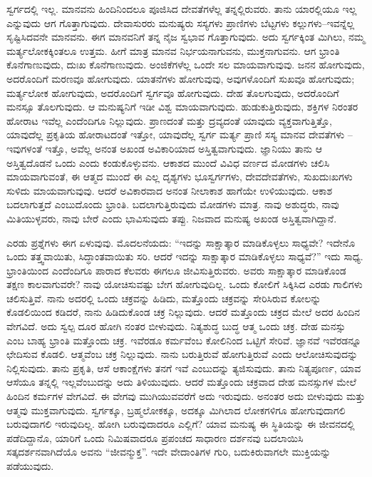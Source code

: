 ಸ್ವರ್ಗದಲ್ಲಿ ಇಲ್ಲ. ಮಾನವನು ಹಿಂದಿನಿಂದಲೂ ಪೂಜಿಸಿದ ದೇವತೆಗಳೆಲ್ಲ ತನ್ನಲ್ಲಿರುವರು. ತಾನು ಯಾರಲ್ಲಿಯೂ ಇಲ್ಲ ಎನ್ನುವುದು ಆಗ ಗೊತ್ತಾಗುವುದು. ದೇವಾಸುರರು ಮನುಷ್ಯರು ಸಸ್ಯಗಳು ಪ್ರಾಣಿಗಳು ಬೆಟ್ಟಗಳು ಕಲ್ಲುಗಳು–ಇವನ್ನೆಲ್ಲ ಸೃಷ್ಟಿಸಿದವನೇ ಮಾನವನು. ಈಗ ಮಾನವನಿಗೆ ತನ್ನ ನೈಜ ಸ್ವಭಾವ ಗೊತ್ತಾಗುವುದು. ಅದು ಸ್ವರ್ಗಕ್ಕಿಂತ ಮಿಗಿಲು, ನಮ್ಮ ಮರ್ತ್ಯಲೋಕಕ್ಕಿಂತಲೂ ಉತ್ತಮ. ಹೀಗೆ ಮಾತ್ರ ಮಾನವ ನಿರ್ಭಯನಾಗುವನು, ಮುಕ್ತನಾಗುವನು. ಆಗ ಭ್ರಾಂತಿ ಕೊನೆಗಾಣುವುದು, ದುಃಖ ಕೊನೆಗಾಣುವುದು. ಅಂಜಿಕೆಗಳೆಲ್ಲ ಒಂದೇ ಸಲ ಮಾಯವಾಗುವುವು. ಜನನ ಹೋಗುವುದು, ಅದರೊಂದಿಗೆ ಮರಣವೂ ಹೋಗುವುದು. ಯಾತನೆಗಳು ಹೋಗುವುವು, ಅವುಗಳೊಂದಿಗೆ ಸುಖವೂ ಹೋಗುವುದು; ಮರ್ತ್ಯಲೋಕ ಹೋಗುವುದು, ಅದರೊಂದಿಗೆ ಸ್ವರ್ಗವೂ ಹೋಗುವುದು. ದೇಹ ತೊಲಗುವುದು, ಅದರೊಂದಿಗೆ ಮನಸ್ಸೂ ತೊಲಗುವುದು. ಆ ಮನುಷ್ಯನಿಗೆ ಇಡೀ ವಿಶ್ವ ಮಾಯವಾಗುವುದು. ಹುಡುಕುತ್ತಿರುವುದು, ಶಕ್ತಿಗಳ ನಿರಂತರ ಹೋರಾಟ ಇವೆಲ್ಲ ಎಂದೆಂದಿಗೂ ನಿಲ್ಲುವುದು. ಪ್ರಾಣದಂತೆ ಮತ್ತು ದ್ರವ್ಯದಂತೆ ಯಾವುದು ವ್ಯಕ್ತವಾಗುತ್ತಿತ್ತೊ, ಯಾವುದೆಲ್ಲ ಪ್ರಕೃತಿಯ ಹೋರಾಟದಂತೆ ಇತ್ತೋ, ಯಾವುದೆಲ್ಲ ಸ್ವರ್ಗ ಮರ್ತ್ಯ ಪ್ರಾಣಿ ಸಸ್ಯ ಮಾನವ ದೇವತೆಗಳು – ಇವುಗಳಂತೆ ಇತ್ತೊ, ಅವೆಲ್ಲ ಅನಂತ ಅಖಂಡ ಅವಿಕಾರಿಯಾದ ಅಸ್ತಿತ್ವವಾಗುವುದು. ಜ್ಞಾನಿಯು ತಾನು ಆ ಅಸ್ತಿತ್ವದೊಡನೆ ಒಂದು ಎಂದು ಕಂಡುಕೊಳ್ಳುವನು. ಆಕಾಶದ ಮುಂದೆ ವಿವಿಧ ವರ್ಣದ ಮೋಡಗಳು ಚಲಿಸಿ ಮಾಯವಾಗುವಂತೆ, ಈ ಆತ್ಮದ ಮುಂದೆ ಈ ಎಲ್ಲ ದೃಶ್ಯಗಳು ಭೂಸ್ವರ್ಗಗಳು, ದೇವದೇವತೆಗಳು, ಸುಖದುಃಖಗಳು ಸುಳಿದು ಮಾಯವಾಗುವುವು. ಆದರೆ ಅವಿಕಾರವಾದ ಅನಂತ ನೀಲಾಕಾಶ ಹಾಗೆಯೇ ಉಳಿಯುವುದು. ಆಕಾಶ ಬದಲಾಗುತ್ತದೆ ಎಂಬುದೊಂದು ಭ್ರಾಂತಿ. ಬದಲಾಗುತ್ತಿರುವುದು ಮೋಡಗಳು ಮಾತ್ರ. ನಾವು ಅಶುದ್ಧರು, ನಾವು ಮಿತಿಯುಳ್ಳವರು, ನಾವು ಬೇರೆ ಎಂದು ಭಾವಿಸುವುದು ತಪ್ಪು. ನಿಜವಾದ ಮನುಷ್ಯ ಅಖಂಡ ಅಸ್ತಿತ್ವವಾಗಿದ್ದಾನೆ.

ಎರಡು ಪ್ರಶ್ನೆಗಳು ಈಗ ಏಳುವುವು. ಮೊದಲನೆಯದು: “ಇದನ್ನು ಸಾಕ್ಷಾತ್ಕಾರ ಮಾಡಿಕೊಳ್ಳಲು ಸಾಧ್ಯವೇ? ಇದೇನೊ ಒಂದು ತತ್ತ್ವವಾಯಿತು, ಸಿದ್ಧಾಂತವಾಯಿತು ಸರಿ. ಆದರೆ ಇದನ್ನು ಸಾಕ್ಷಾತ್ಕಾರ ಮಾಡಿಕೊಳ್ಳಲು ಸಾಧ್ಯವೆ?” ಇದು ಸಾಧ್ಯ. ಭ್ರಾಂತಿಯಿಂದ ಎಂದೆಂದಿಗೂ ಪಾರಾದ ಕೆಲವರು ಈಗಲೂ ಜೀವಿಸುತ್ತಿರುವರು. ಅವರು ಸಾಕ್ಷಾತ್ಕಾರ ಮಾಡಿಕೊಂಡ ತಕ್ಷಣ ಕಾಲವಾಗುವರೇ? ನಾವು ಯೋಚಿಸುವಷ್ಟು ಬೇಗ ಹೋಗುವುದಿಲ್ಲ. ಒಂದು ಕೋಲಿಗೆ ಸಿಕ್ಕಿಸಿದ ಎರಡು ಗಾಲಿಗಳು ಚಲಿಸುತ್ತಿವೆ. ನಾನು ಅದರಲ್ಲಿ ಒಂದು ಚಕ್ರವನ್ನು ಹಿಡಿದು, ಮತ್ತೊಂದು ಚಕ್ರವನ್ನು ಸೇರಿಸಿರುವ ಕೋಲನ್ನು ಕೊಡಲಿಯಿಂದ ಕಡಿದರೆ, ನಾನು ಹಿಡಿದುಕೊಂಡ ಚಕ್ರ ನಿಲ್ಲುವುದು. ಆದರೆ ಮತ್ತೊಂದು ಚಕ್ರದ ಮೇಲೆ ಅದರ ಹಿಂದಿನ ವೇಗವಿದೆ. ಅದು ಸ್ವಲ್ಪ ದೂರ ಹೋಗಿ ನಂತರ ಬೀಳುವುದು. ನಿತ್ಯಶುದ್ಧ ಬುದ್ಧ ಆತ್ಮ ಒಂದು ಚಕ್ರ. ದೇಹ ಮನಸ್ಸು ಎಂಬ ಬಾಹ್ಯ ಭ್ರಾಂತಿ ಮತ್ತೊಂದು ಚಕ್ರ. ಇವೆರಡೂ ಕರ್ಮವೆಂಬ ಕೋಲಿನಿಂದ ಒಟ್ಟಿಗೆ ಸೇರಿವೆ. ಜ್ಞಾನವೆ ಇವೆರಡನ್ನೂ ಛೇದಿಸುವ ಕೊಡಲಿ. ಆತ್ಮವೆಂಬ ಚಕ್ರ ನಿಲ್ಲುವುದು. ನಾನು ಬರುತ್ತಿರುವೆ ಹೋಗುತ್ತಿರುವೆ ಎಂದು ಆಲೋಚಿಸುವುದನ್ನು ನಿಲ್ಲಿಸುವುದು. ತಾನು ಪ್ರಕೃತಿ, ಆಸೆ ಆಕಾಂಕ್ಷೆಗಳು ತನಗೆ ಇವೆ ಎಂಬುದನ್ನು ತ್ಯಜಿಸುವುದು. ತಾನು ನಿತ್ಯಪೂರ್ಣ, ಯಾವ ಆಸೆಯೂ ತನ್ನಲ್ಲಿ ಇಲ್ಲವೆಂಬುದನ್ನು ಅದು ತಿಳಿಯುವುದು. ಆದರೆ ಮತ್ತೊಂದು ಚಕ್ರವಾದ ದೇಹ ಮನಸ್ಸುಗಳ ಮೇಲೆ ಹಿಂದಿನ ಕರ್ಮಗಳ ವೇಗವಿದೆ. ಈ ವೇಗವು ಮುಗಿಯುವವರೆಗೆ ಅದು ಇರುವುದು. ಅನಂತರ ಅದು ಬೀಳುವುದು ಮತ್ತು ಆತ್ಮವು ಮುಕ್ತವಾಗುವುದು. ಸ್ವರ್ಗಕ್ಕೂ, ಬ್ರಹ್ಮಲೋಕಕ್ಕೂ, ಅದಕ್ಕೂ ಮಿಗಿಲಾದ ಲೋಕಗಳಿಗೂ ಹೋಗುವುದಾಗಲಿ ಬರುವುದಾಗಲಿ ಇರುವುದಿಲ್ಲ. ಹೋಗಿ ಬರುವುದಾದರೂ ಎಲ್ಲಿಗೆ? ಯಾವ ಮನುಷ್ಯ ಈ ಸ್ಥಿತಿಯನ್ನು ಈ ಜೀವನದಲ್ಲಿ ಪಡೆದಿದ್ದಾನೊ, ಯಾರಿಗೆ ಒಂದು ನಿಮಿಷವಾದರೂ ಪ್ರಪಂಚದ ಸಾಧಾರಣ ದರ್ಶನವು ಬದಲಾಯಿಸಿ ಸತ್ಕದರ್ಶನವಾಗಿದೆಯೊ ಅವನು “ಜೀವನ್ಮುಕ್ತ”. ಇದೇ ವೇದಾಂತಿಗಳ ಗುರಿ, ಬದುಕಿರುವಾಗಲೇ ಮುಕ್ತಿಯನ್ನು ಪಡೆಯುವುದು.


